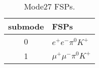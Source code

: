 \begin{table}[h!]
\begin{center}
\begin{tabular}{cl}
\hline
submode& FSPs\\
\hline
0 & $e^+ e^- \pi^0 K^+ $ \\
1 & $\mu^+ \mu^- \pi^0 K^+ $ \\
\hline
\end{tabular}
\label{tab:Mode27FSPs}
\caption{Mode27 FSPs.}
\end{center}
\end{table}
